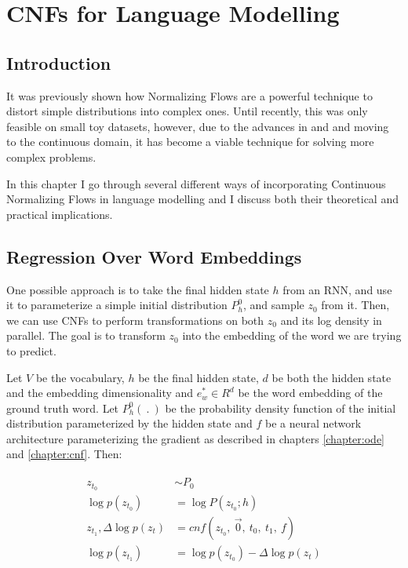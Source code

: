 \chapter{CNFs for Language Modelling}
\label{chapter:cnf_lm}

\section{Introduction}
\label{section:cnf_lm:introduction}

It was previously shown how Normalizing Flows are a powerful technique to distort simple distributions into complex ones. Until recently, this was only feasible on small toy datasets, however, due to the advances in \citet{chen2018neural} and \citet{grathwohl2018ffjord} and moving to the continuous domain, it has become a viable technique for solving more complex problems.

In this chapter I go through several different ways of incorporating Continuous Normalizing Flows in language modelling and I discuss both their theoretical and practical implications.


\section{Regression Over Word Embeddings}
\label{section:cnf_lm:regression}

One possible approach is to take the final hidden state $ h $ from an RNN, and use it to parameterize a simple initial distribution $ P_h^0 $, and sample $ z_0 $ from it. Then, we can use CNFs to perform transformations on both $ z_0 $ and its log density in parallel. The goal is to transform $ z_0 $ into the embedding of the word we are trying to predict.

Let $ V $ be the vocabulary, $ h $ be the final hidden state, $ d $ be both the hidden state and the embedding dimensionality and $ e_w^* \in R^{d} $ be the word embedding of the ground truth word. Let $ P_h^0( \ . \ ) $ be the probability density function of the initial distribution parameterized by the hidden state and $ f $ be a neural network architecture parameterizing the gradient as described in chapters \ref{chapter:ode} and \ref{chapter:cnf}. Then:

\begin{align}
    \label{equation:cnf_lm:regression:regression_word_embedding}
    \begin{split}
        z_{t_0} &\sim P_0 \\
        \log p(z_{t_0}) &= \log P(z_{t_0}; h) \\
        z_{t_1}, \Delta \log p (z_t) &= cnf(z_{t_0}, \ \vec{0}, \ t_0 , \ t_1 , \ f) \\
        \log p (z_{t_1}) &= \log p(z_{t_0}) -  \Delta \log  p (z_t)
    \end{split}
\end{align}

